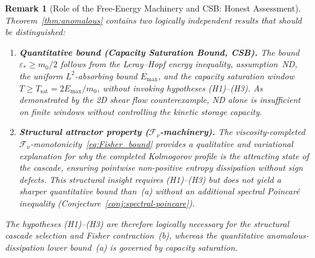 \documentclass[12pt,a4paper]{article}
\theoremstyle{breakdef}
\theoremstyle{breakplain}
\theoremstyle{breakdef}
\newtheorem{remark}[definition]{Remark}
\begin{document}
\begin{remark}[Role of the Free-Energy Machinery and CSB: Honest Assessment]
\label{rem:F-role}
Theorem~\ref{thm:anomalous} contains two logically independent results
that should be distinguished:
\begin{enumerate}
\item[(a)] \textbf{Quantitative bound (Capacity Saturation Bound, CSB).}\quad
  The bound $\varepsilon_* \ge m_0/2$ follows from the Leray--Hopf energy
  inequality, assumption~ND, the uniform $L^2$-absorbing bound $E_{\max}$,
  and the capacity saturation window $T \ge T_{\mathrm{sat}} = 2E_{\max}/m_0$,
  \emph{without} invoking hypotheses (H1)--(H3). As demonstrated by the
  2D shear flow counterexample, ND alone is insufficient on finite windows without
  controlling the kinetic storage capacity.
\item[(b)] \textbf{Structural attractor property ($\mathcal{F}_\nu$-machinery).}\;
  The viscosity-completed $\mathcal{F}_\nu$-monotonicity~\eqref{eq:Fisher_bound}
  provides a \emph{qualitative and variational} explanation for why the
  completed Kolmogorov profile is the attracting state of the cascade,
  ensuring pointwise non-positive entropy dissipation without sign defects.
  This structural insight requires (H1)--(H3) but does \emph{not}
  yield a sharper quantitative bound than~(a) without an additional
  spectral Poincaré inequality (Conjecture~\ref{conj:spectral-poincare}).
\end{enumerate}
The hypotheses (H1)--(H3) are therefore logically necessary for
the structural cascade selection and Fisher contraction~(b), whereas the quantitative
anomalous-dissipation lower bound~(a) is governed by capacity saturation.
\end{remark}
\end{document}

